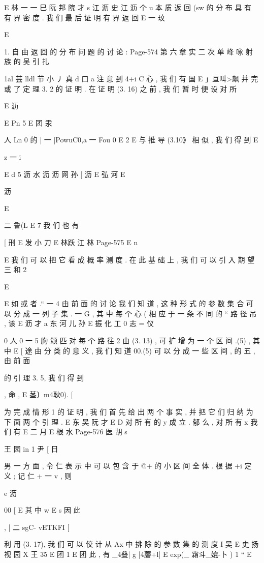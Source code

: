 {{E 林 一 一
巳 阮 邦 院 才 s 江 沥 史 江
沥 个 u
本 质 返 回 (sw } 的 分 布 具 有 有 界 密 度 . 我 们 最 后 证 明 有 界 返 回 { }
E 一 玟

E

1. 自 由 返 回 的 分 布 问 题 的 讨 论 :
Page-574
第 六 章 实 二 次 单 峰 咏 射 族 的 吴 引 扎

1al 芸 lldl 节 小 丿 真 d 口 a
注 意 到 4+i C 心 , 我 们 有 国
E 」亘叫>飙
并 完 或 了 定 理 3. 2 的 证 明 . 在 证 明 (3. 16) 之 前 , 我 们 暂 时 便 设 对 所

E 沥

E
Pn 5
E 团 汞

人
Ln 0 的 | 一 |PowuC0,a 一 Fou 0
E 2
E
与 推 导 (3.10》 相 似 , 我 们 得 到
E

z 一
i

E d
5 沥 水 沥 沥 网 孙
[ 沥 E 弘
河
E

沥

E

二 鲁(L E 7
我 们 也 有

[ 刑 E 发 小 刀
E 林跃 江 林
Page-575
E n

E
我 们 可 以 把 它 看 成 概 率 测 度 . 在 此 基 础 上 , 我 们 可 以 引 入 期 望 三 和
2

E

E 如
或 者 .“ 一 4 由 前 面 的 讨 论 我 们 知 道 , 这 种 形 式 的 参 数 集 合 可 以 分
成 一 列 子 集 . 一 G , 其 中 每 个 心 ( 相 应 于 一 条 不 同 的 “ 路 径 吊 , 该
E 沥 才 a 东 河 儿 孙
E 振 化 工 0 志 = 仪

0 人 0 一 5 朐
颂 匹
对 每 个 路 往 2 由 (3. 13) , 可 扩 增 为 一 个 区 间 .(5) , 其 中
E [ 途
由 分 类 的 意 义 , 我 们 知 道 00.(5) 可 以 分 成 一 些 区 间 , 的 五 , 由 前 面

的 引 理 3. 5, 我 们 得 到

, 命 ,
E 茎〕m4耿0). [

为 完 成 情 形 1 的 证 明 , 我 们 首 先 给 出 两 个 事 实 , 并 把 它 们 归 纳
为 下 面 两 个 引 理 .
E 东 吴 阮 才
E
D
对 所 有 的 y 成 立 . 郁 么 , 对 所 有 x 我 们 有
E 二 月
E 根 水
Page-576
医 胡 s

王
园 in
1 尹 [ 日

男 一 方 面 , 令 仁 表 示 中 可 以 包 含 于 @+ 的 小 区 间 全 体 . 根
据 +i 定 义 ; 记 仁 + 一 v , 则

e 沥

00
[ E
其 中 w E s 因 此

, | 二 sgC- vETKFI
[

利 用 (3. 17), 我 们 可 以 佼 计 从 Ax 中 排 除 的 参 数 集 的 测 度
I 吴 E 史 扬 视 园 X 王 35 E
团 1 E
团 此 , 有
_4叠| g |4蘑+l| E exp(_ 霜斗_媲-卜 )
1 “ E

}
